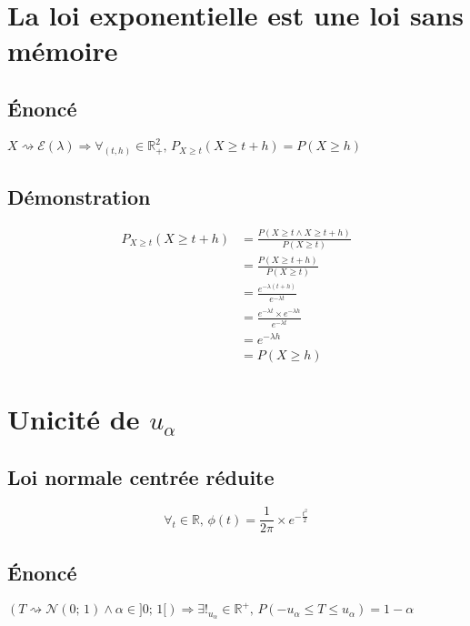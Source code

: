 \documentclass[12px]{article}
\begin{document}
	\section{La loi exponentielle est une loi sans mémoire}
	
	\subsection{\'Enoncé}
	$X\rightsquigarrow\mathcal{E}(\lambda) \Rightarrow \forall_{(t,h)}\in\mathbb{R}_+^2,
	\,P_{X\geq t}(X\geq t+h) = P(X\geq h)$
	
	\subsection{Démonstration}
	\begin{align*}
	P_{X\geq t}(X\geq t+h) &= \frac{P(X\geq t\wedge X\geq t+h)}{P(X\geq t)}\\
	&= \frac{P(X\geq t+h)}{P(X\geq t)}\\
	&= \frac{ e^{-\lambda (t+h)} }{ e^{-\lambda t} }\\
	&= \frac{ e^{-\lambda t}\times e^{-\lambda h} }{ e^{-\lambda t} }\\
	&= e^{-\lambda h}\\
	&= P(X\geq h)
	\end{align*}
	
	\section{Unicité de $u_\alpha$}
	
	\subsection{Loi normale centrée réduite}
	\begin{displaymath}
		\forall_t\in\mathbb{R},\, \phi (t) = \frac{1}{2\pi}\times e^{ -\frac{t^2}{2} }
	\end{displaymath}
	
	\subsection{\'Enoncé}
	$(T\rightsquigarrow\mathcal{N}(0;\, 1) \wedge \alpha\in ]0;\, 1[)
	\Rightarrow \exists !_{u_\alpha}\in\mathbb{R}^+,
	\,P(-u_\alpha\leq T\leq u_\alpha) = 1 - \alpha$
	
\end{document}
